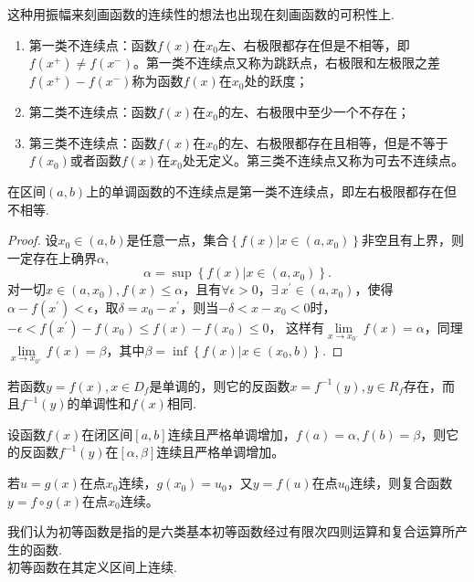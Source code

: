 	这种用振幅来刻画函数的连续性的想法也出现在刻画函数的可积性上.
	\begin{definition}[三类不连续点]
		\begin{enumerate}
			\item 第一类不连续点：函数$f(x)$在$x_0$左、右极限都存在但是不相等，即$f(x^{+})\neq f(x^{-})$。第一类不连续点又称为跳跃点，右极限和左极限之差$f(x^{+})-f(x^{-})$称为函数$f(x)$在$x_0$处的跃度；
			\item 第二类不连续点：函数$f(x)$在$x_0$的左、右极限中至少一个不存在；
			\item 第三类不连续点：函数$f(x)$在$x_0$的左、右极限都存在且相等，但是不等于$f(x_0)$或者函数$f(x)$在$x_0$处无定义。第三类不连续点又称为可去不连续点。
		\end{enumerate}
	\end{definition}
	\begin{property}
		在区间$(a,b)$上的单调函数的不连续点是第一类不连续点，即左右极限都存在但不相等.
	\end{property}
	\begin{proof}
		设$x_0\in(a,b)$是任意一点，集合$\left\{f(x)\vert x\in(a,x_0)\right\}$非空且有上界，则一定存在上确界$\alpha$,$$\alpha=\sup\left\{f(x)\vert x\in(a,x_0)\right\}.$$
		对一切$x\in(a,x_0),f(x)\leq\alpha$，且有$\forall\epsilon>0$，$\exists\ x^{'}\in(a,x_0)$，使得$\alpha-f(x^{'})<\epsilon$，取$\delta=x_0-x^{'}$，则当$-\delta<x-x_0<0$时，$-\epsilon<f(x^{'})-f(x_0)\leq f(x)-f(x_0)\leq0$，
		这样有$\lim\limits_{x\rightarrow x_{0^{-}}}f(x)=\alpha$，同理$\lim\limits_{x\rightarrow x_{0^{+}}}f(x)=\beta$，其中$\beta=\inf\left\{f(x)\vert x\in(x_0,b)\right\}.$

	\end{proof}
	\begin{theorem}[连续函数的四则运算]
		
	\end{theorem}
	\begin{theorem}[反函数的存在性]
		若函数$y=f(x),x\in D_f$是单调的，则它的反函数$x=f^{-1}(y),y\in R_f$存在，而且$f^{-1}(y)$的单调性和$f(x)$相同.
	\end{theorem}
	\begin{theorem}[反函数的连续性]
		设函数$f(x)$在闭区间$\left[a,b\right]$连续且严格单调增加，$f(a)=\alpha ,f(b)=\beta$，则它的反函数$f^{-1}(y)$在$\left[\alpha ,\beta\right]$连续且严格单调增加。
	\end{theorem}
	\begin{theorem}[复合函数的连续性]
		若$u=g(x)$在点$x_0$连续，$g(x_0)=u_0$，又$y=f(u)$在点$u_0$连续，则复合函数$y=f\circ g(x)$在点$x_0$连续。
	\end{theorem}
	\begin{theorem}[初等函数的连续性]
		我们认为{\kaishu 初等函数}是指的是六类{\kaishu 基本初等函数}经过{\kaishu 有限次}四则运算和复合运算所产生的函数.\\
		初等函数在其{\kaishu 定义区间}上连续.
	\end{theorem}

